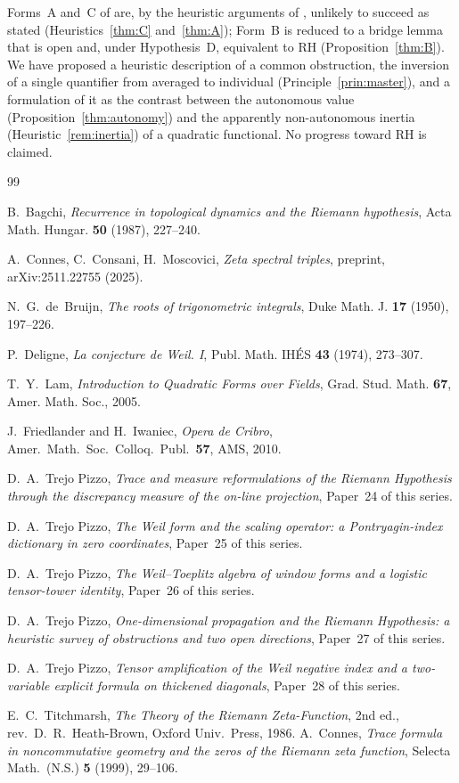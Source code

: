 \documentclass[11pt]{amsart}
\theoremstyle{definition}
\theoremstyle{remark}
\begin{document}
Forms~A and~C of \cite{P27} are, by the heuristic arguments of \cite{P28},
unlikely to succeed as stated (Heuristics~\ref{thm:C} and~\ref{thm:A}); Form~B
is reduced to a bridge lemma that is open and, under Hypothesis~D, equivalent
to RH (Proposition~\ref{thm:B}). We have proposed a heuristic description of
a common obstruction, the inversion of a single quantifier from averaged to
individual (Principle~\ref{prin:master}), and a formulation of it as the
contrast between the autonomous value (Proposition~\ref{thm:autonomy}) and
the apparently non-autonomous inertia (Heuristic~\ref{rem:inertia}) of a
quadratic functional. No progress toward RH is claimed.

\begin{thebibliography}{99}

 B.~Bagchi, \emph{Recurrence in topological dynamics and the Riemann
hypothesis}, Acta Math. Hungar. \textbf{50} (1987), 227--240.

 A.~Connes, C.~Consani, H.~Moscovici, \emph{Zeta spectral triples}, preprint,
arXiv:2511.22755 (2025).

 N.~G.~de~Bruijn, \emph{The roots of trigonometric
integrals}, Duke Math. J. \textbf{17} (1950), 197--226.

 P.~Deligne, \emph{La conjecture de Weil. I},
Publ. Math. IH\'ES \textbf{43} (1974), 273--307.

 T.~Y.~Lam, \emph{Introduction to Quadratic Forms over Fields}, Grad. Stud. Math.
\textbf{67}, Amer. Math. Soc., 2005.

 J.~Friedlander and H.~Iwaniec, \emph{Opera de Cribro}, Amer.\ Math.\ Soc.\ Colloq.\ Publ.\ \textbf{57}, AMS, 2010.

 D.~A.~Trejo Pizzo, \emph{Trace and measure reformulations of the Riemann
Hypothesis through the discrepancy measure of the on-line projection}, Paper~24 of this series.

 D.~A.~Trejo Pizzo, \emph{The Weil form and the scaling operator: a
Pontryagin-index dictionary in zero coordinates}, Paper~25 of this series.

 D.~A.~Trejo Pizzo, \emph{The Weil--Toeplitz algebra of window forms and a
logistic tensor-tower identity}, Paper~26 of this series.

 D.~A.~Trejo Pizzo, \emph{One-dimensional propagation and the Riemann
Hypothesis: a heuristic survey of obstructions and two open directions}, Paper~27 of this
series.

 D.~A.~Trejo Pizzo, \emph{Tensor amplification of the Weil negative index and a
two-variable explicit formula on thickened diagonals}, Paper~28 of this series.

 E.~C.~Titchmarsh, \emph{The Theory of the Riemann Zeta-Function}, 2nd ed., rev.\ D.~R.~Heath-Brown, Oxford Univ.\ Press, 1986.
 A.~Connes, \emph{Trace formula in noncommutative geometry and the zeros of the Riemann zeta function}, Selecta Math.\ (N.S.) \textbf{5} (1999), 29--106.
\end{thebibliography}
\end{document}
